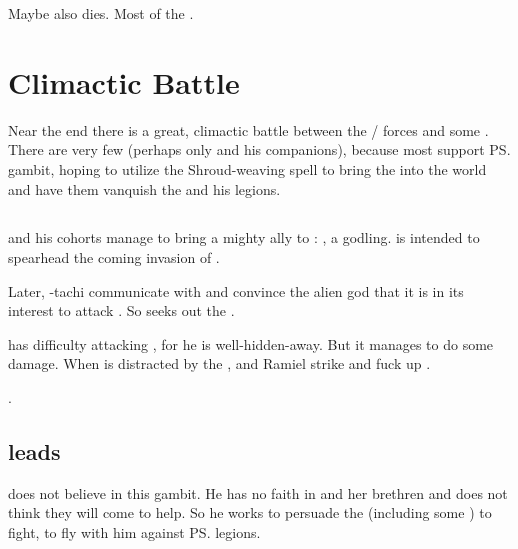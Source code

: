 Maybe \Zereth also dies. 
Most of the . 















\section{Climactic Battle}
Near the end there is a great, climactic battle between the \bane/\resphan{} forces and some . 
There are very few \dragons{} (perhaps only \Ishnaruchaefir{} and his companions), because most \dragons{} support \ps{\Secherdamon} gambit, hoping to utilize the \pps{\banes}{} Shroud-weaving spell to bring the \firstgendragons{} into the world and have them vanquish the \Voidbringer{} and his legions.







\subsection{\HothNrul}
\Vizsherioch{} and his cohorts manage to bring a mighty ally to \Miith: 
, a \xsic{} godling. 
\HothNrul{} is intended to spearhead the coming \xs{} invasion of \Miith. 

Later, \Ishnaruchaefir-tachi communicate with \HothNrul{} and convince the alien god that it is in its interest to attack \Daggerrain.
So \HothNrul{} seeks out the \banelord. 

\HothNrul{} has difficulty attacking \Daggerrain, for he is well-hidden-away. 
But it manages to do some damage. 
When \Daggerrain{} is distracted by the \xs{}, \Azraid{} and Ramiel strike and fuck up \Daggerrain. 

\HothNrul{} . 







\subsection{\Ishnaruchaefir leads \dragons}
\Ishnaruchaefir{} does not believe in this gambit. He has no faith in \Tiamat{} and her brethren and does not think they will come to help. 
So he works to persuade the \dragons{} (including some ) to fight, to fly with him against \ps{\Daggerrain}{} legions. 

